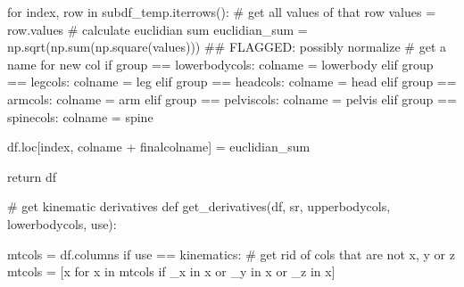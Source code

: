 \documentclass[
  letterpaper,
  DIV=11,
  numbers=noendperiod]{scrreprt}
\newenvironment{Shaded}{\begin{snugshade}}{\end{snugshade}}
\newcommand{\BuiltInTok}[1]{\textcolor[rgb]{0.00,0.23,0.31}{#1}}
\newcommand{\CommentTok}[1]{\textcolor[rgb]{0.37,0.37,0.37}{#1}}
\newcommand{\ControlFlowTok}[1]{\textcolor[rgb]{0.00,0.23,0.31}{#1}}
\newcommand{\KeywordTok}[1]{\textcolor[rgb]{0.00,0.23,0.31}{#1}}
\newcommand{\NormalTok}[1]{\textcolor[rgb]{0.00,0.23,0.31}{#1}}
\newcommand{\OperatorTok}[1]{\textcolor[rgb]{0.37,0.37,0.37}{#1}}
\newcommand{\StringTok}[1]{\textcolor[rgb]{0.13,0.47,0.30}{#1}}
\begin{document}
\begin{Shaded}
\begin{Highlighting}[]
        \ControlFlowTok{for}\NormalTok{ index, row }\KeywordTok{in}\NormalTok{ subdf\_temp.iterrows():}
            \CommentTok{\# get all values of that row}
\NormalTok{            values }\OperatorTok{=}\NormalTok{ row.values}
            \CommentTok{\# calculate euclidian sum}
\NormalTok{            euclidian\_sum }\OperatorTok{=}\NormalTok{ np.sqrt(np.}\BuiltInTok{sum}\NormalTok{(np.square(values))) }\CommentTok{\#\# FLAGGED: possibly normalize}
            \CommentTok{\# get a name for new col}
            \ControlFlowTok{if}\NormalTok{ group }\OperatorTok{==}\NormalTok{ lowerbodycols:}
\NormalTok{                colname }\OperatorTok{=} \StringTok{\textquotesingle{}lowerbody\textquotesingle{}}
            \ControlFlowTok{elif}\NormalTok{ group }\OperatorTok{==}\NormalTok{ legcols:}
\NormalTok{                colname }\OperatorTok{=} \StringTok{\textquotesingle{}leg\textquotesingle{}}
            \ControlFlowTok{elif}\NormalTok{ group }\OperatorTok{==}\NormalTok{ headcols:}
\NormalTok{                colname }\OperatorTok{=} \StringTok{\textquotesingle{}head\textquotesingle{}}
            \ControlFlowTok{elif}\NormalTok{ group }\OperatorTok{==}\NormalTok{ armcols:}
\NormalTok{                colname }\OperatorTok{=} \StringTok{\textquotesingle{}arm\textquotesingle{}}
            \ControlFlowTok{elif}\NormalTok{ group }\OperatorTok{==}\NormalTok{ pelviscols:}
\NormalTok{                colname }\OperatorTok{=} \StringTok{\textquotesingle{}pelvis\textquotesingle{}}
            \ControlFlowTok{elif}\NormalTok{ group }\OperatorTok{==}\NormalTok{ spinecols:}
\NormalTok{                colname }\OperatorTok{=} \StringTok{\textquotesingle{}spine\textquotesingle{}}
                

\NormalTok{            df.loc[index, colname }\OperatorTok{+}\NormalTok{ finalcolname] }\OperatorTok{=}\NormalTok{ euclidian\_sum}

    \ControlFlowTok{return}\NormalTok{ df}


\CommentTok{\# get kinematic derivatives}
\KeywordTok{def}\NormalTok{ get\_derivatives(df, sr, upperbodycols, lowerbodycols, use):}

\NormalTok{    mtcols }\OperatorTok{=}\NormalTok{ df.columns}
    \ControlFlowTok{if}\NormalTok{ use }\OperatorTok{==} \StringTok{\textquotesingle{}kinematics\textquotesingle{}}\NormalTok{:}
        \CommentTok{\# get rid of cols that are not x, y or z}
\NormalTok{        mtcols }\OperatorTok{=}\NormalTok{ [x }\ControlFlowTok{for}\NormalTok{ x }\KeywordTok{in}\NormalTok{ mtcols }\ControlFlowTok{if} \StringTok{\textquotesingle{}\_x\textquotesingle{}} \KeywordTok{in}\NormalTok{ x }\KeywordTok{or} \StringTok{\textquotesingle{}\_y\textquotesingle{}} \KeywordTok{in}\NormalTok{ x }\KeywordTok{or} \StringTok{\textquotesingle{}\_z\textquotesingle{}} \KeywordTok{in}\NormalTok{ x]}
    


\end{Highlighting}
\end{Shaded}
\end{document}
